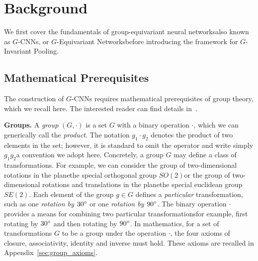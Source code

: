 \section{Background}

We first cover the fundamentals of group-equivariant neural networks\textemdash also known as $G$-CNNs, or $G$-Equivariant Networks\textemdash before introducing the framework for $G$-Invariant Pooling.

\subsection{Mathematical Prerequisites}

The construction of $G$-CNNs requires mathematical prerequisites of group theory, which we recall here. The interested reader can find details in~\cite{hall2013lie}.

\textbf{Groups.} A \textit{group} $(G,\cdot)$ is a set $G$ with a binary operation $\cdot$, which we can generically call the \textit{product}. The notation $g_1 \cdot g_2$ denotes the product of two elements in the set; however, it is standard to omit the operator and write simply $g_1g_2$\textemdash a convention we adopt here. Concretely, a group $G$ may define a class of transformations. For example, we can consider the group of two-dimensional rotations in the plane\textemdash the special orthogonal group $SO(2)$\textemdash or the group of two-dimensional rotations and translations in the plane\textemdash the special euclidean group $SE(2)$. Each element of the group $g \in G$ defines a \textit{particular} transformation, such as one \textit{rotation by $30 \degree$} or one \textit{rotation by $90 \degree$}. The binary operation $\cdot$ provides a means for combining two particular transformations\textemdash for example, first rotating by $30\degree$ and then rotating by $90 \degree$. In mathematics, for a set of transformations $G$ to be a group under the operation $\cdot$, the four axioms of closure, associativity, identity and inverse must hold. These axioms are recalled in Appendix~\ref{sec:group_axioms}.



